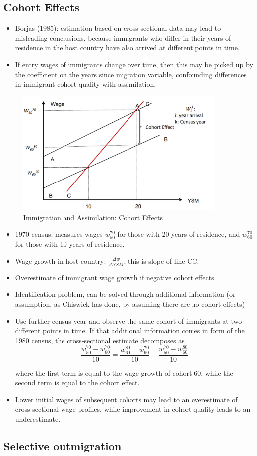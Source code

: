 \subsection{Cohort Effects}
\begin{itemize}
\item Borjas (1985): estimation based on cross-sectional data may lead to misleading conclusions, because immigrants who differ in their years of residence in the host country have also arrived at different points in time.
\item If entry wages of immigrants change over time, then this may be picked up by the coefficient on the years since migration variable, confounding differences in immigrant cohort quality with assimilation.
\end{itemize}
    \begin{figure}[H]
                \centering
                \includegraphics[width=4in]{images/ch11/14.png}
                \caption{Immigration and Assimilation: Cohort Effects}
            \end{figure}
\begin{itemize}            
\item 1970 census: measures wages   $w_{50}^{70}$ for those with 20 years of residence, and $w_{60}^{70}$ for those with 10 years of residence.
\item Wage growth in host country: $\frac{\Delta w}{\Delta YSM}$; this is slope of line CC.
\item Overestimate of immigrant wage growth if negative cohort effects.
\item Identification problem, can be solved through additional information (or assumption, as Chiswick has done, by assuming there are no cohort effects)
\item Use further census year and observe the same cohort of immigrants at two different points in time. If that additional information comes in form of the 1980 census, the cross-sectional estimate decomposes as
$$\frac{w_{50}^{70}-w_{60}^{70}}{10}=\frac{w_{60}^{80}-w_{60}^{70}}{10}-\frac{w_{50}^{70}-w_{60}^{80}}{10} $$

where the first term is equal to the wage growth of cohort 60, while the second term is equal to the cohort effect.
\item Lower initial wages of subsequent cohorts may lead to an overestimate of cross-sectional wage profiles, while improvement in cohort quality leads to an underestimate.
\end{itemize}

\subsection{Selective outmigration}